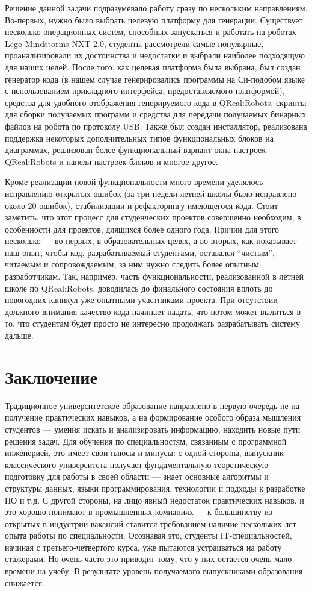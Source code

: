 \documentclass[a4paper]{article}
\begin{document}
Решение данной задачи подразумевало работу сразу по нескольким направлениям. Во-первых, нужно было выбрать целевую платформу для генерации. Существует несколько операционных систем, способных запускаться и работать на роботах Lego Mindstorms NXT 2.0, студенты рассмотрели самые популярные, проанализировали их достоинства и недостатки и выбрали наиболее подходящую для наших целей. После того, как целевая платформа была выбрана, был создан генератор кода (в нашем случае генерировались программы на Си-подобом языке с использованием прикладного интерфейса, предоставляемого платформой), средства для удобного отображения генерируемого кода в QReal:Robots, скрипты для сборки получаемых программ и средства для передачи получаемых бинарных файлов на робота по протоколу USB. Также был создан инсталлятор, реализована поддержка некоторых дополнительных типов функциональных блоков на диаграммах, реализован более функциональный вариант окна настроек QReal:Robots и панели настроек блоков и многое другое.

Кроме реализации новой функциональности много времени уделялось исправлению открытых ошибок (за три недели летней школы было исправлено около 20 ошибок), стабилизации и рефакторингу имеющегося кода. Стоит заметить, что этот процесс для студенческих проектов совершенно необходим, в особенности для проектов, длящихся более одного года. Причин для этого несколько --- во-первых, в образовательных целях, а во-вторых, как показывает наш опыт, чтобы код, разрабатываемый студентами, оставался ``чистым'', читаемым и сопровождаемым, за ним нужно следить более опытным разработчикам. Так, например, часть функциональности, реализованной в летней школе по QReal:Robots, доводилась до финального состояния вплоть до новогодних каникул уже опытными участниками проекта. При отсутствии должного внимания качество кода начинает падать, что потом может вылиться в то, что студентам будет просто не интересно продолжать разрабатывать систему дальше.

\section{Заключение}

Традиционное университетское образование направлено в первую очередь не на получение практических навыков, а на формирование особого образа мышления студентов --- умения искать и анализировать информацию, находить новые пути решения задач. Для обучения по специальностям, связанным с программной инженерией, это имеет свои плюсы и минусы: с одной стороны, выпускник классического университета получает фундаментальную теоретическую подготовку для работы в своей области --- знает основные алгоритмы и структуры данных, языки программирования, технологии и подходы к разработке ПО и т.д. С другой стороны, на лицо явный недостаток практических навыков, и это хорошо понимают в промышленных компаниях --- к большинству из открытых в индустрии вакансий ставится требованием наличие нескольких лет опыта работы по специальности. Осознавая это, студенты IT-специальностей, начиная с третьего-четвертого курса, уже пытаются устраиваться на работу стажерами. Но очень часто это приводит тому, что у них остается очень мало времени на учебу. В результате уровень получаемого выпускниками образования снижается.
\end{document}
